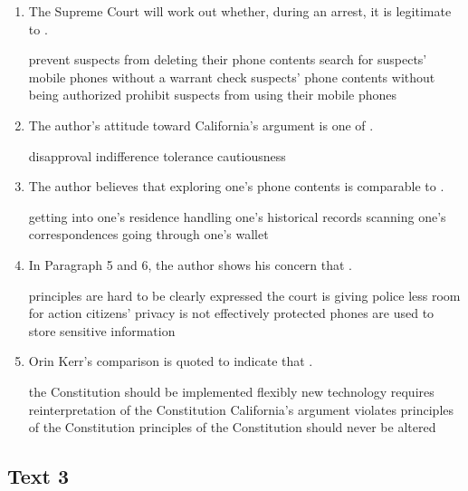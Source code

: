 \begin{enumerate}[resume]
	\item
The Supreme Court will work out whether, during an arrest,
it is legitimate to \lineread.


\fourchoices
{prevent suspects from deleting their phone contents}
{search for suspects' mobile phones without a warrant}
{check suspects' phone contents without being authorized}
{prohibit suspects from using their mobile phones}


\item
The author's attitude toward California's argument is one
of \lineread.


\fourchoices
{disapproval}
{indifference}
{tolerance}
{cautiousness}



\item
The author believes that exploring one's phone contents is
comparable to \lineread.


\fourchoices
{getting into one's residence}
{handling one's historical records}
{scanning one's correspondences}
{going through one's wallet}



\item
 In Paragraph 5 and 6, the author shows his concern
that \lineread.


\fourchoices
{principles are hard to be clearly expressed}
{the court is giving police less room for action}
{citizens' privacy is not effectively protected}
{phones are used to store sensitive information}


\item
Orin Kerr's comparison is quoted to indicate
that \lineread.


\fourchoices
{the Constitution should be implemented flexibly}
{new technology requires reinterpretation of the Constitution}
{California's argument violates principles of the Constitution}
{principles of the Constitution should never be altered}


\end{enumerate}



\newpage
\subsection{Text 3}


